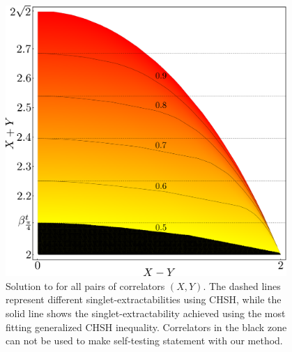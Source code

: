 \begin{figure}
	\begin{center}
		\includegraphics[width=0.95\textwidth]{chapters/selftesting/img/generalizedCHSH.pdf}
	\end{center}
	\caption{Solution to  for all pairs of correlators $(X,Y)$. The dashed lines represent different singlet-extractabilities using CHSH, while the solid line shows the singlet-extractability achieved using the most fitting generalized CHSH inequality. Correlators in the black zone can not be used to make self-testing statement with our method.}
	\label{fig:generalizedCHSHfid}
\end{figure}

